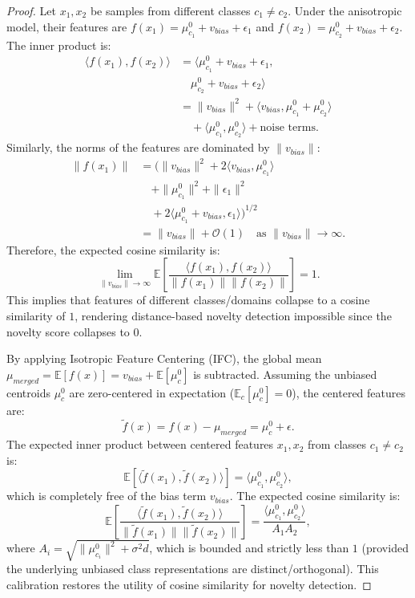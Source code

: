 \documentclass[twoside]{article}
\begin{document}
\begin{proof}
Let $x_1, x_2$ be samples from different classes $c_1 \neq c_2$. Under the anisotropic model, their features are $f(x_1) = \mu_{c_1}^0 + v_{bias} + \epsilon_1$ and $f(x_2) = \mu_{c_2}^0 + v_{bias} + \epsilon_2$.
The inner product is:
\begin{align*}
\langle f(x_1), f(x_2) \rangle &= \langle \mu_{c_1}^0 + v_{bias} + \epsilon_1, \\
&\quad \mu_{c_2}^0 + v_{bias} + \epsilon_2 \rangle \\
&= \|v_{bias}\|^2 + \langle v_{bias}, \mu_{c_1}^0 + \mu_{c_2}^0 \rangle \\
&\quad + \langle \mu_{c_1}^0, \mu_{c_2}^0 \rangle + \text{noise terms}.
\end{align*}
Similarly, the norms of the features are dominated by $\|v_{bias}\|$:
\begin{align*}
\|f(x_1)\| &= \big(\|v_{bias}\|^2 + 2\langle v_{bias}, \mu_{c_1}^0 \rangle \\
&\quad + \|\mu_{c_1}^0\|^2 + \|\epsilon_1\|^2 \\
&\quad + 2\langle \mu_{c_1}^0 + v_{bias}, \epsilon_1 \rangle\big)^{1/2} \\
&= \|v_{bias}\| + \mathcal{O}(1) \quad \text{as } \|v_{bias}\| \to \infty.
\end{align*}
Therefore, the expected cosine similarity is:
\begin{equation*}
\lim_{\|v_{bias}\| \to \infty} \mathbb{E}\left[ \frac{\langle f(x_1), f(x_2) \rangle}{\|f(x_1)\| \|f(x_2)\|} \right] = 1.
\end{equation*}
This implies that features of different classes/domains collapse to a cosine similarity of $1$, rendering distance-based novelty detection impossible since the novelty score collapses to $0$.

By applying Isotropic Feature Centering (IFC), the global mean $\mu_{merged} = \mathbb{E}[f(x)] = v_{bias} + \mathbb{E}[\mu_c^0]$ is subtracted. Assuming the unbiased centroids $\mu_c^0$ are zero-centered in expectation ($\mathbb{E}_c[\mu_c^0] = 0$), the centered features are:
\begin{equation*}
\tilde{f}(x) = f(x) - \mu_{merged} = \mu_c^0 + \epsilon.
\end{equation*}
The expected inner product between centered features $x_1, x_2$ from classes $c_1 \neq c_2$ is:
\begin{equation*}
\mathbb{E}[\langle \tilde{f}(x_1), \tilde{f}(x_2) \rangle] = \langle \mu_{c_1}^0, \mu_{c_2}^0 \rangle,
\end{equation*}
which is completely free of the bias term $v_{bias}$. The expected cosine similarity is:
\begin{equation*}
\mathbb{E}\left[ \frac{\langle \tilde{f}(x_1), \tilde{f}(x_2) \rangle}{\|\tilde{f}(x_1)\| \|\tilde{f}(x_2)\|} \right] = \frac{\langle \mu_{c_1}^0, \mu_{c_2}^0 \rangle}{A_1 A_2},
\end{equation*}
where $A_i = \sqrt{\|\mu_{c_i}^0\|^2 + \sigma^2 d}$, which is bounded and strictly less than $1$ (provided the underlying unbiased class representations are distinct/orthogonal). This calibration restores the utility of cosine similarity for novelty detection.
\end{proof}
\end{document}
